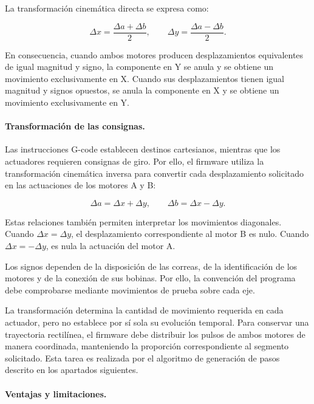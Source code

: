 \documentclass[blue,fullpaper]{ludusofficial}  %
\begin{document}
La transformación cinemática directa
se expresa como:

\begin{equation}
    \Delta x = \frac{\Delta a + \Delta b}{2},
    \qquad
    \Delta y = \frac{\Delta a - \Delta b}{2}.
    \label{eq:corexy-directa}
\end{equation}

En consecuencia, cuando ambos motores
producen desplazamientos equivalentes
de igual magnitud y signo, la componente
en Y se anula y se obtiene un movimiento
exclusivamente en X. Cuando sus
desplazamientos tienen igual magnitud
y signos opuestos, se anula la componente
en X y se obtiene un movimiento
exclusivamente en Y.

\paragraph{Transformación de las consignas.}

Las instrucciones G-code establecen
destinos cartesianos, mientras que los
actuadores requieren consignas de giro.
Por ello, el firmware utiliza la
transformación cinemática inversa
para convertir cada desplazamiento
solicitado en las actuaciones de
los motores A y B:

\begin{equation}
    \Delta a = \Delta x + \Delta y,
    \qquad
    \Delta b = \Delta x - \Delta y.
    \label{eq:corexy-inversa}
\end{equation}

Estas relaciones también permiten
interpretar los movimientos diagonales.
Cuando $\Delta x = \Delta y$,
el desplazamiento correspondiente
al motor B es nulo. Cuando
$\Delta x = -\Delta y$, es nula
la actuación del motor A.

Los signos dependen de la disposición
de las correas, de la identificación
de los motores y de la conexión
de sus bobinas. Por ello, la convención
del programa debe comprobarse mediante
movimientos de prueba sobre cada eje.

La transformación determina la cantidad
de movimiento requerida en cada actuador,
pero no establece por sí sola su evolución
temporal. Para conservar una trayectoria
rectilínea, el firmware debe distribuir
los pulsos de ambos motores de manera
coordinada, manteniendo la proporción
correspondiente al segmento solicitado.
Esta tarea es realizada por el algoritmo
de generación de pasos descrito
en los apartados siguientes.

\paragraph{Ventajas y limitaciones.}
\end{document}
